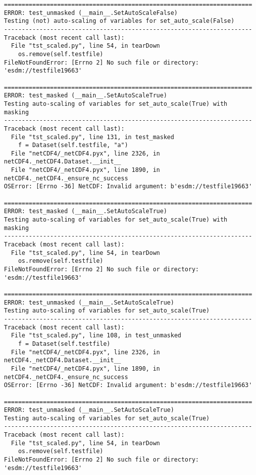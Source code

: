 \begin{verbatim}
======================================================================
ERROR: test_unmasked (__main__.SetAutoScaleFalse)
Testing (not) auto-scaling of variables for set_auto_scale(False)
----------------------------------------------------------------------
Traceback (most recent call last):
  File "tst_scaled.py", line 54, in tearDown
    os.remove(self.testfile)
FileNotFoundError: [Errno 2] No such file or directory: 'esdm://testfile19663'

======================================================================
ERROR: test_masked (__main__.SetAutoScaleTrue)
Testing auto-scaling of variables for set_auto_scale(True) with masking
----------------------------------------------------------------------
Traceback (most recent call last):
  File "tst_scaled.py", line 131, in test_masked
    f = Dataset(self.testfile, "a")
  File "netCDF4/_netCDF4.pyx", line 2326, in netCDF4._netCDF4.Dataset.__init__
  File "netCDF4/_netCDF4.pyx", line 1890, in netCDF4._netCDF4._ensure_nc_success
OSError: [Errno -36] NetCDF: Invalid argument: b'esdm://testfile19663'

======================================================================
ERROR: test_masked (__main__.SetAutoScaleTrue)
Testing auto-scaling of variables for set_auto_scale(True) with masking
----------------------------------------------------------------------
Traceback (most recent call last):
  File "tst_scaled.py", line 54, in tearDown
    os.remove(self.testfile)
FileNotFoundError: [Errno 2] No such file or directory: 'esdm://testfile19663'

======================================================================
ERROR: test_unmasked (__main__.SetAutoScaleTrue)
Testing auto-scaling of variables for set_auto_scale(True)
----------------------------------------------------------------------
Traceback (most recent call last):
  File "tst_scaled.py", line 108, in test_unmasked
    f = Dataset(self.testfile)
  File "netCDF4/_netCDF4.pyx", line 2326, in netCDF4._netCDF4.Dataset.__init__
  File "netCDF4/_netCDF4.pyx", line 1890, in netCDF4._netCDF4._ensure_nc_success
OSError: [Errno -36] NetCDF: Invalid argument: b'esdm://testfile19663'

======================================================================
ERROR: test_unmasked (__main__.SetAutoScaleTrue)
Testing auto-scaling of variables for set_auto_scale(True)
----------------------------------------------------------------------
Traceback (most recent call last):
  File "tst_scaled.py", line 54, in tearDown
    os.remove(self.testfile)
FileNotFoundError: [Errno 2] No such file or directory: 'esdm://testfile19663'


\end{verbatim}
